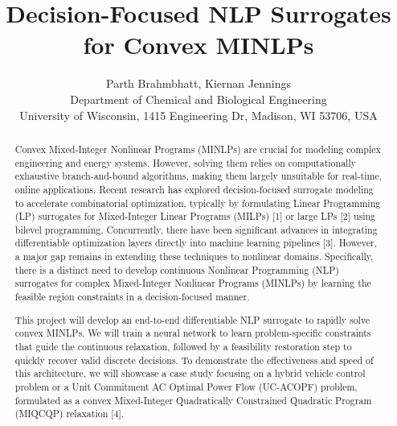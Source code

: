 \documentclass[11pt,twoside]{article}
\begin{document}
	
\title{Decision-Focused NLP Surrogates for Convex MINLPs}

\author{Parth Brahmbhatt, Kiernan Jennings\\
	{\small Department of Chemical and Biological Engineering}\\
	{\small \;University of Wisconsin, 1415 Engineering Dr, Madison, WI 53706, USA}}
\date{}
\maketitle
	
	
\begin{abstract}	
	Convex Mixed-Integer Nonlinear Programs (MINLPs) are crucial for modeling complex engineering and energy systems. However, solving them relies on computationally exhaustive branch-and-bound algorithms, making them largely unsuitable for real-time, online applications. Recent research has explored decision-focused surrogate modeling to accelerate combinatorial optimization, typically by formulating Linear Programming (LP) surrogates for Mixed-Integer Linear Programs (MILPs) [1] or large LPs [2] using bilevel programming. Concurrently, there have been significant advances in integrating differentiable optimization layers directly into machine learning pipelines [3]. However, a major gap remains in extending these techniques to nonlinear domains. Specifically, there is a distinct need to develop continuous Nonlinear Programming (NLP) surrogates for complex Mixed-Integer Nonlinear Programs (MINLPs) by learning the feasible region constraints in a decision-focused manner.
	
	This project will develop an end-to-end differentiable NLP surrogate to rapidly solve convex MINLPs. We will train a neural network to learn problem-specific constraints that guide the continuous relaxation, followed by a feasibility restoration step to quickly recover valid discrete decisions. To demonstrate the effectiveness and speed of this architecture, we will showcase a case study focusing on a hybrid vehicle control problem or a Unit Commitment AC Optimal Power Flow (UC-ACOPF) problem, formulated as a convex Mixed-Integer Quadratically Constrained Quadratic Program (MIQCQP) relaxation [4].
	
%	
%	
%	
	
\end{abstract}
\end{document}
